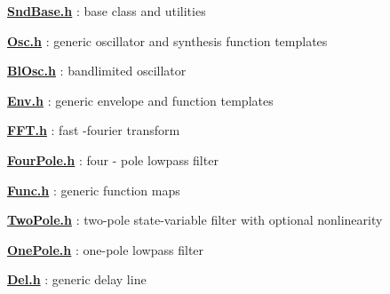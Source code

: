 {\bfseries \hyperlink{_snd_base_8h}{Snd\+Base.\+h}} \+: base class and utilities

{\bfseries \hyperlink{_osc_8h}{Osc.\+h}} \+: generic oscillator and synthesis function templates

{\bfseries \hyperlink{_bl_osc_8h}{Bl\+Osc.\+h}} \+: bandlimited oscillator

{\bfseries \hyperlink{_env_8h}{Env.\+h}} \+: generic envelope and function templates

{\bfseries \hyperlink{_f_f_t_8h}{F\+F\+T.\+h}} \+: fast -\/fourier transform

{\bfseries \hyperlink{_four_pole_8h}{Four\+Pole.\+h}} \+: four -\/ pole lowpass filter

{\bfseries \hyperlink{_func_8h}{Func.\+h}} \+: generic function maps

{\bfseries \hyperlink{_two_pole_8h}{Two\+Pole.\+h}} \+: two-\/pole state-\/variable filter with optional nonlinearity

{\bfseries \hyperlink{_one_pole_8h}{One\+Pole.\+h}} \+: one-\/pole lowpass filter

{\bfseries \hyperlink{_del_8h}{Del.\+h}} \+: generic delay line 